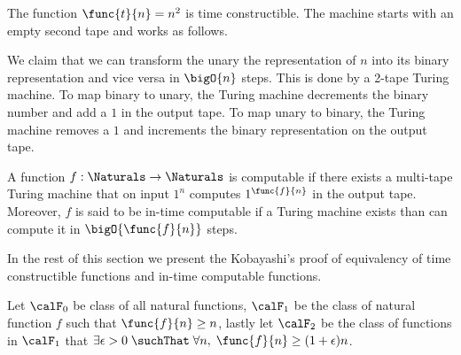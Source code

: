 \begin{example}
    The function \(\func{t}{n} = n^2\) is time constructible. The machine starts with an empty second tape and works as follows.
    \begin{center}
    \end{center}
\end{example}

\begin{remark}
    We claim that we can transform the unary the representation of \(n\) into its binary representation and vice versa in \(\bigO{n}\) steps. This is done by a 2-tape Turing machine. To map binary to unary, the Turing machine decrements the binary number and add a \(1\) in the output tape. To map unary to binary, the Turing machine removes a \(1\) and increments the binary representation on the output tape.
\end{remark}

\begin{definition}
    A function \(f: \Naturals \to \Naturals\) is computable if there exists a multi-tape Turing machine that on input \(1^{n}\) computes \(1^{\func{f}{n}}\) in the output tape. Moreover, \(f\) is said to be in-time computable if a Turing machine exists than can compute it in \(\bigO{\func{f}{n}}\) steps. 
\end{definition}

In the rest of this section we present the Kobayashi's proof of equivalency of time constructible functions and in-time computable functions.

Let \(\calF_0\) be class of all natural functions, \(\calF_1\) be the class of natural function \(f\) such that \(\func{f}{n} \geq n\), lastly let \(\calF_2\) be the class of functions in \(\calF_1\) that \(\exists \epsilon > 0 \; \suchThat\; \forall n,\; \func{f}{n} \geq (1+\epsilon) n\). 


